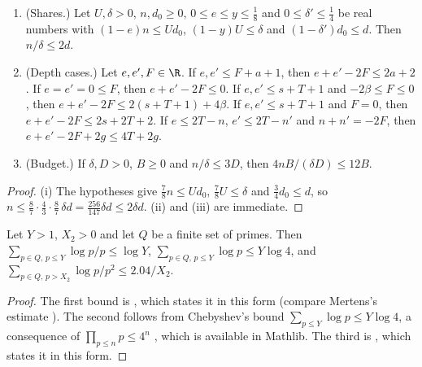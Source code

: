 \begin{lemma}\label{pf:onto3:numerics}
\begin{enumerate}[label=(\roman*)]
\item (Shares.) Let $U,\delta>0$, $n,d_0\ge0$, $0\le e\le y\le\frac18$ and $0\le\delta'\le\frac14$ be real numbers
with $(1-e)n\le Ud_0$, $(1-y)U\le\delta$ and $(1-\delta')d_0\le d$. Then $n/\delta\le2d$.
\item (Depth cases.) Let $e,e',F\in\R$. If $e,e'\le F+a+1$, then $e+e'-2F\le2a+2$. If $e=e'=0\le F$, then
$e+e'-2F\le0$. If $e,e'\le s+T+1$ and $-2\beta\le F\le0$, then $e+e'-2F\le2(s+T+1)+4\beta$. If $e,e'\le s+T+1$ and
$F=0$, then $e+e'-2F\le2s+2T+2$. If $e\le2T-n$, $e'\le2T-n'$ and $n+n'=-2F$, then $e+e'-2F+2g\le4T+2g$.
\item (Budget.) If $\delta,D>0$, $B\ge0$ and $n/\delta\le3D$, then $4nB/(\delta D)\le12B$.
\end{enumerate}
\end{lemma}

\begin{proof}
(i) The hypotheses give $\frac78n\le Ud_0$, $\frac78U\le\delta$ and $\frac34d_0\le d$, so
$n\le\frac87\cdot\frac43\cdot\frac87\,\delta d=\frac{256}{147}\delta d\le2\delta d$. (ii) and (iii) are immediate.
\end{proof}

\begin{lemma}\label{pf:onto3:primes}
Let $Y>1$, $X_2>0$ and let $Q$ be a finite set of primes. Then $\sum_{p\in Q,\,p\le Y}\log p/p\le\log Y$,
$\sum_{p\in Q,\,p\le Y}\log p\le Y\log4$, and $\sum_{p\in Q,\,p>X_2}\log p/p^2\le2.04/X_2$.
\end{lemma}

\begin{proof}
The first bound is , which states it in this form (compare Mertens's estimate
\cite{Mertens1874}). The second follows from Chebyshev's bound $\sum_{p\le Y}\log p\le Y\log 4$, a consequence of
$\prod_{p\le n}p\le4^n$ \cite[Ch.~2]{MontgomeryVaughan2007}, which is available in Mathlib. The third is
, which states it in this form.
\end{proof}

